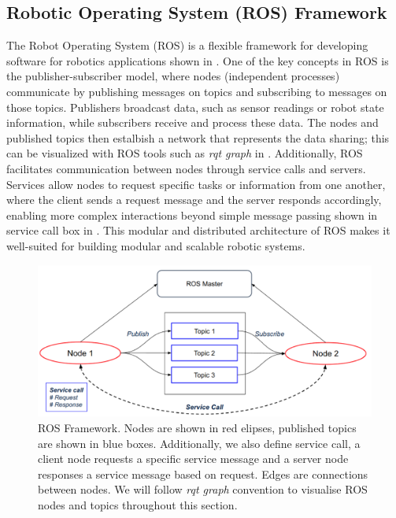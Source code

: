 \subsection{Robotic Operating System (ROS) Framework}
The Robot Operating System (ROS) is a flexible framework for developing software for robotics applications shown in . One of the key concepts in ROS is the publisher-subscriber model, where nodes (independent processes) communicate by publishing messages on topics and subscribing to messages on those topics. Publishers broadcast data, such as sensor readings or robot state information, while subscribers receive and process these data. The nodes and published topics then estalbish a network that represents the data sharing; this can be visualized with ROS tools such as \emph{rqt graph} in . Additionally, ROS facilitates communication between nodes through service calls and servers. Services allow nodes to request specific tasks or information from one another, where the client sends a request message and the server responds accordingly, enabling more complex interactions beyond simple message passing shown in service call box in . This modular and distributed architecture of ROS makes it well-suited for building modular and scalable robotic systems. 
\begin{figure}[t]
  \centering
  \includegraphics[width=0.8\columnwidth]{pics/Implementation_ros_framework2.png}
  \caption{ROS Framework. Nodes are shown in red elipses, published topics are shown in blue boxes. Additionally, we also define service call, a client node requests a specific service message and a server node responses a service message based on request. Edges are connections between nodes. We will follow \emph{rqt graph} convention to visualise ROS nodes and topics throughout this section.}
  \label{fig:implementation_ros}
\end{figure}

